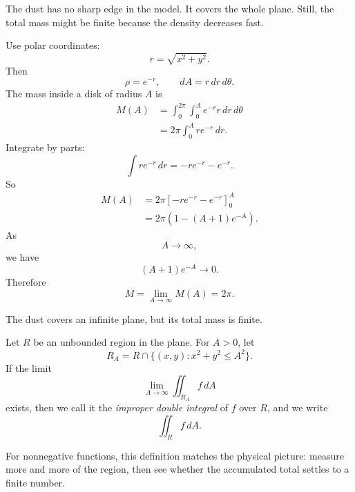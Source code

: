 The dust has no sharp edge in the model.  It covers the whole plane.  Still, the total
mass might be finite because the density decreases fast.

Use polar coordinates:
\[
    r=\sqrt{x^2+y^2}.
\]
Then
\[
    \rho=e^{-r},
    \qquad
    dA=r\,dr\,d\theta.
\]
The mass inside a disk of radius \(A\) is
\[
\begin{aligned}
M(A)
&=
\int_0^{2\pi}\int_0^A e^{-r}r\,dr\,d\theta\\
&=
2\pi\int_0^A re^{-r}\,dr.
\end{aligned}
\]
Integrate by parts:
\[
    \int re^{-r}\,dr=-re^{-r}-e^{-r}.
\]
So
\[
\begin{aligned}
M(A)
&=
2\pi\left[-re^{-r}-e^{-r}\right]_0^A\\
&=
2\pi\left(1-(A+1)e^{-A}\right).
\end{aligned}
\]
As
\[
    A\to\infty,
\]
we have
\[
    (A+1)e^{-A}\to0.
\]
Therefore
\[
\boxed{
    M=\lim_{A\to\infty}M(A)=2\pi.
}
\]

The dust covers an infinite plane, but its total mass is finite.

\begin{definition}
Let \(R\) be an unbounded region in the plane.  For \(A>0\), let
\[
    R_A=R\cap\{(x,y):x^2+y^2\le A^2\}.
\]
If the limit
\[
\boxed{
    \lim_{A\to\infty}\iint_{R_A} f\,dA
}
\]
exists, then we call it the \emph{improper double integral} of \(f\) over \(R\), and we
write
\[
\boxed{
    \iint_R f\,dA.
}
\]
\end{definition}

For nonnegative functions, this definition matches the physical picture: measure more
and more of the region, then see whether the accumulated total settles to a finite
number.


